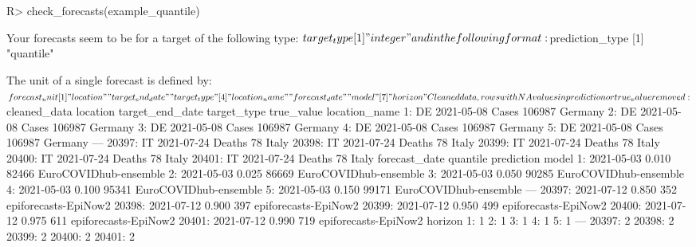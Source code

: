 \documentclass[
]{jss}
\begin{document}
\begin{CodeChunk}
\begin{CodeInput}
R> check_forecasts(example_quantile)
\end{CodeInput}
\begin{CodeOutput}
Your forecasts seem to be for a target of the following type:
$target_type
[1] "integer"

and in the following format:
$prediction_type
[1] "quantile"

The unit of a single forecast is defined by:
$forecast_unit
[1] "location"        "target_end_date" "target_type"    
[4] "location_name"   "forecast_date"   "model"          
[7] "horizon"        

Cleaned data, rows with NA values in prediction or true_value removed:
$cleaned_data
       location target_end_date target_type true_value location_name
    1:       DE      2021-05-08       Cases     106987       Germany
    2:       DE      2021-05-08       Cases     106987       Germany
    3:       DE      2021-05-08       Cases     106987       Germany
    4:       DE      2021-05-08       Cases     106987       Germany
    5:       DE      2021-05-08       Cases     106987       Germany
   ---                                                              
20397:       IT      2021-07-24      Deaths         78         Italy
20398:       IT      2021-07-24      Deaths         78         Italy
20399:       IT      2021-07-24      Deaths         78         Italy
20400:       IT      2021-07-24      Deaths         78         Italy
20401:       IT      2021-07-24      Deaths         78         Italy
       forecast_date quantile prediction                 model
    1:    2021-05-03    0.010      82466 EuroCOVIDhub-ensemble
    2:    2021-05-03    0.025      86669 EuroCOVIDhub-ensemble
    3:    2021-05-03    0.050      90285 EuroCOVIDhub-ensemble
    4:    2021-05-03    0.100      95341 EuroCOVIDhub-ensemble
    5:    2021-05-03    0.150      99171 EuroCOVIDhub-ensemble
   ---                                                        
20397:    2021-07-12    0.850        352  epiforecasts-EpiNow2
20398:    2021-07-12    0.900        397  epiforecasts-EpiNow2
20399:    2021-07-12    0.950        499  epiforecasts-EpiNow2
20400:    2021-07-12    0.975        611  epiforecasts-EpiNow2
20401:    2021-07-12    0.990        719  epiforecasts-EpiNow2
       horizon
    1:       1
    2:       1
    3:       1
    4:       1
    5:       1
   ---        
20397:       2
20398:       2
20399:       2
20400:       2
20401:       2


\end{CodeOutput}
\end{CodeChunk}
\end{document}
